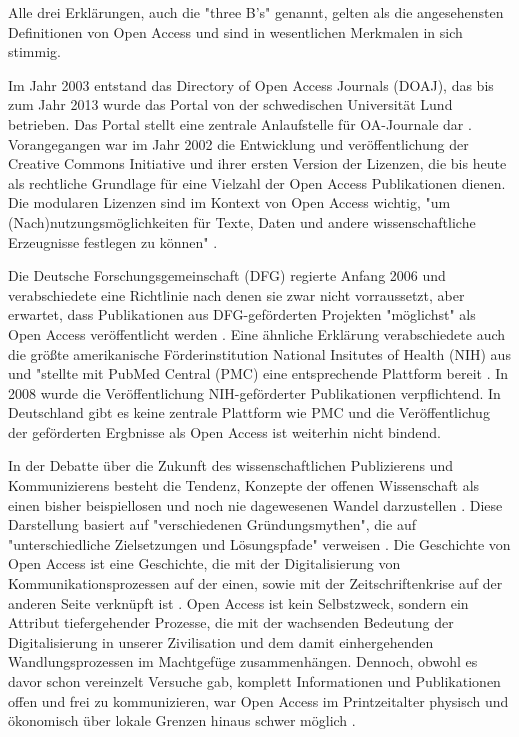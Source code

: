 Alle drei Erklärungen, auch die "three B's"\cite{suber_2004_praising_oa} genannt, gelten als die angesehensten Definitionen von Open Access und sind in wesentlichen Merkmalen in sich stimmig\cite{albert_2006_open_implications}.

Im Jahr 2003 entstand das Directory of Open Access Journals (DOAJ), das bis zum Jahr 2013 wurde das Portal von der schwedischen Universität Lund betrieben. Das Portal stellt eine zentrale Anlaufstelle für OA-Journale dar \cite{suchen-Hoffmann-Zugang-undVerwertung-öffentlicher-Informationen}. Vorangegangen war im Jahr 2002 die Entwicklung und veröffentlichung der Creative Commons Initiative \cite{suchen-Hoffmann-Zugang-undVerwertung-öffentlicher-Informationen} und ihrer ersten Version der Lizenzen, die bis heute als rechtliche Grundlage für eine Vielzahl der Open Access Publikationen dienen\cite{suchen}. Die modularen Lizenzen sind im Kontext von Open Access wichtig, "um (Nach)nutzungsmöglichkeiten für Texte, Daten und andere wissenschaftliche Erzeugnisse festlegen zu können" \cite{suchen-Hoffmann-Zugang-undVerwertung-öffentlicher-Informationen}.

Die Deutsche Forschungsgemeinschaft (DFG) regierte Anfang 2006 und verabschiedete eine Richtlinie nach denen sie zwar nicht vorraussetzt, aber erwartet, dass Publikationen aus DFG-geförderten Projekten "möglichst" als Open Access veröffentlicht werden \cite{suchen:dfg-richtlinie}. Eine ähnliche Erklärung verabschiedete auch die größte amerikanische Förderinstitution National Insitutes of Health (NIH) aus und "stellte mit PubMed Central (PMC) eine entsprechende Plattform bereit \cite{muller_2010_open}. In 2008 wurde die Veröffentlichung NIH-geförderter Publikationen verpflichtend. In Deutschland gibt es keine zentrale Plattform wie PMC und die Veröffentlichug der geförderten Ergbnisse als Open Access ist weiterhin nicht bindend. 

In der Debatte über die Zukunft des wissenschaftlichen Publizierens und Kommunizierens besteht die Tendenz, Konzepte der offenen Wissenschaft als einen bisher beispiellosen und noch nie dagewesenen Wandel darzustellen \cite{cite:17a} \cite{cite:17b}. Diese Darstellung basiert auf "verschiedenen Gründungsmythen", die auf "unterschiedliche Zielsetzungen und Lösungspfade" verweisen \cite{suchen-Hoffmann-Zugang-undVerwertung-öffentlicher-Informationen}. Die Geschichte von Open Access ist eine Geschichte, die mit der Digitalisierung von Kommunikationsprozessen \cite{albert_2006_open_implications} auf der einen, sowie mit der Zeitschriftenkrise auf der anderen Seite verknüpft ist \cite{suchen-Hoffmann-Zugang-undVerwertung-öffentlicher-Informationen}. Open Access ist kein Selbstzweck\cite{cite:17d}, sondern ein Attribut tiefergehender Prozesse, die mit der wachsenden Bedeutung der Digitalisierung in unserer Zivilisation und dem damit einhergehenden Wandlungsprozessen im Machtgefüge zusammenhängen\cite{cite:17e}. Dennoch, obwohl es davor schon vereinzelt Versuche gab, komplett Informationen und Publikationen offen und frei zu kommunizieren, war Open Access im Printzeitalter physisch und ökonomisch über lokale Grenzen hinaus schwer möglich \cite{cite:18a}. 

